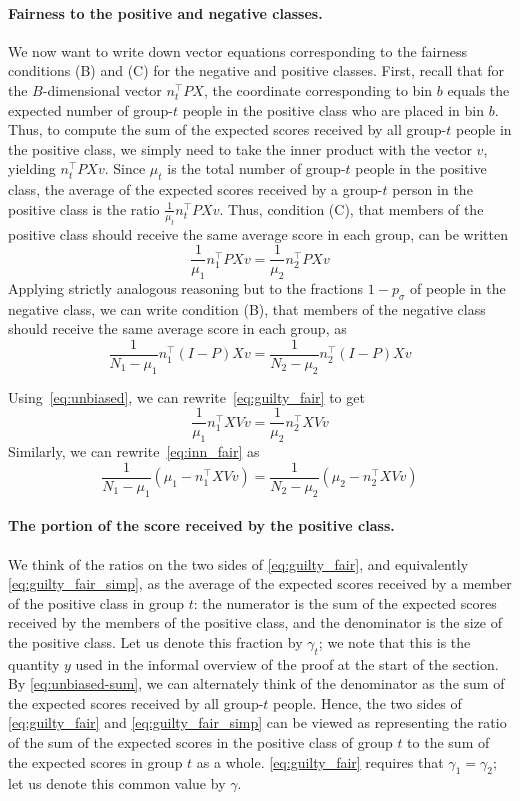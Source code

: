 \documentclass[11pt]{article}
\newcommand{\xhdr}[1]{\vspace{-0.2in} \paragraph*{\bf {#1}.}}
\def\tran{^{\top}}
\begin{document}
\xhdr{Fairness to the positive and negative classes}
We now want to write down vector equations corresponding to 
the fairness conditions (B) and (C) for the negative and positive classes.
First, recall that for the $B$-dimensional vector
$n_t\tran P X$, the coordinate corresponding
to bin $b$ equals the expected number of group-$t$ people in the positive 
class who are placed in bin $b$.  
Thus, to compute the sum of the expected scores 
received by all group-$t$ people
in the positive class, we simply need to take the inner product with
the vector $v$, yielding $n_t\tran P X v$.  Since $\mu_t$ is the total
number of group-$t$ people in the positive class, the average 
of the expected scores received 
by a group-$t$ person in the positive class is the ratio
$\displaystyle{\frac{1}{\mu_t} n_t\tran PXv}$.
Thus, condition (C), that members of the positive class should receive
the same average score in each group, can be written
\begin{equation}
  \frac{1}{\mu_1} n_1\tran PXv = \frac{1}{\mu_2} n_2\tran PXv
  \label{eq:guilty_fair}
\end{equation}
Applying strictly analogous reasoning but to the fractions 
$1 - p_\sigma$ of people in the negative class,
we can write condition (B),
that members of the negative class should receive
the same average score in each group, as
\begin{equation}
  \frac{1}{N_1-\mu_1} n_1\tran (I-P)Xv = \frac{1}{N_2-\mu_2} n_2\tran (I-P)Xv
  \label{eq:inn_fair}
\end{equation}

Using~\eqref{eq:unbiased}, we can rewrite~\eqref{eq:guilty_fair} to get
\begin{equation}
  \frac{1}{\mu_1} n_1\tran XVv = \frac{1}{\mu_2} n_2\tran XVv
  \label{eq:guilty_fair_simp}
\end{equation}
Similarly, we can rewrite~\eqref{eq:inn_fair} as
\begin{equation}
  \frac{1}{N_1-\mu_1} (\mu_1 - n_1\tran XVv) = \frac{1}{N_2-\mu_2} (\mu_2 - n_2\tran XVv)
  \label{eq:inn_fair_simp}
\end{equation}

\xhdr{The portion of the score received by the positive class}
We think of the ratios on the two sides of 
\eqref{eq:guilty_fair}, and equivalently \eqref{eq:guilty_fair_simp},
as the average of the expected
scores received by a member of the positive class in group $t$:
the numerator is the sum of the expected scores received by the members of the
positive class, and the denominator is the size of the positive class.
Let us denote this fraction by $\gamma_t$; we note that this is
the quantity $y$ used in the informal overview of the proof at the
start of the section.
By \eqref{eq:unbiased-sum}, we can alternately think of the denominator
as the sum of the expected scores received by all group-$t$ people.
Hence, the two sides of \eqref{eq:guilty_fair} and \eqref{eq:guilty_fair_simp}
can be viewed as representing the ratio of the sum of the expected
scores in the positive class of group $t$ to the sum of the expected scores
in group $t$ as a whole.
\eqref{eq:guilty_fair} requires that $\gamma_1 = \gamma_2$; let us
denote this common value by $\gamma$. 
\end{document}
